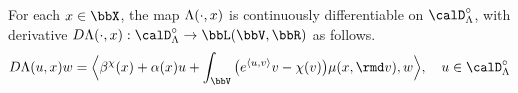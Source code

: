 \begin{lemma}
  \label{lemma:ode-differentiable}
  For each $\stateVar \in \stateSpace$, the map $\Lambda(\cdot,x)$ is continuously differentiable on $\odeSpace^\circ$, with derivative $D\ode(\cdot,\stateVar): \odeSpace^\circ \rightarrow \bbL(\vecSpace, \bbR)$ as follows.
  \begin{equation}
    D\ode(\momentVar,\stateVar) w = \Bprj{\affDrift^\trunc(\stateVar) + \affDiff(\stateVar)\momentVar + \int_\vecSpace \big( e^\prj{\momentVar}{\markVar} \markVar - \trunc(\markVar)\big) \affJump(\stateVar,\rmd\markVar)}{w}, \quad \momentVar \in \odeSpace^\circ
  \end{equation}
\end{lemma}
